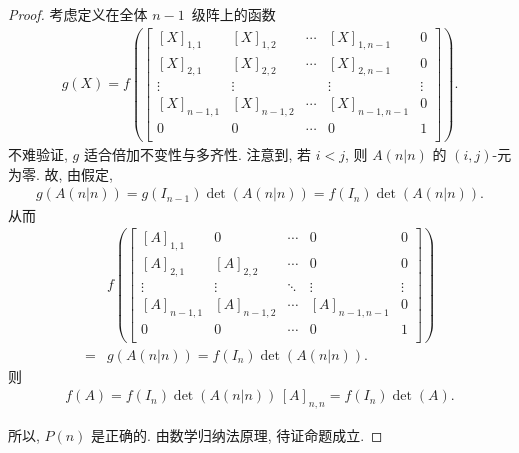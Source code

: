 \begin{proof}
    考虑定义在全体 \(n-1\)~级阵上的函数
    \begin{align*}
        g(X)
        =
        f\left(
        \begin{bmatrix}
            [X]_{1,1}   & [X]_{1,2}   & \cdots & [X]_{1,n-1}   & 0      \\
            [X]_{2,1}   & [X]_{2,2}   & \cdots & [X]_{2,n-1}   & 0      \\
            \vdots      & \vdots      & {}     & \vdots        & \vdots \\
            [X]_{n-1,1} & [X]_{n-1,2} & \cdots & [X]_{n-1,n-1} & 0      \\
            0           & 0           & \cdots & 0             & 1      \\
        \end{bmatrix}
        \right).
    \end{align*}
    不难验证, \(g\) 适合倍加不变性与多齐性.
    注意到, 若 \(i < j\),
    则 \(A(n|n)\) 的 \((i, j)\)-元为零.
    故, 由假定,
    \begin{align*}
        g(A(n|n)) = g(I_{n-1}) \det {(A(n|n))}
        = f(I_n) \det {(A(n|n))}.
    \end{align*}
    从而
    \begin{align*}
             &
        f\left(
        \begin{bmatrix}
                [A]_{1,1}   & 0           & \cdots & 0             & 0      \\
                [A]_{2,1}   & [A]_{2,2}   & \cdots & 0             & 0      \\
                \vdots      & \vdots      & \ddots & \vdots        & \vdots \\
                [A]_{n-1,1} & [A]_{n-1,2} & \cdots & [A]_{n-1,n-1} & 0      \\
                0           & 0           & \cdots & 0             & 1      \\
            \end{bmatrix}
        \right)
        \\
        = {} &
        g(A(n|n)) = f(I_n) \det {(A(n|n))}.
    \end{align*}
    则
    \begin{align*}
        f(A) = f(I_n) \det {(A(n|n))}\,[A]_{n,n}
        = f(I_n) \det {(A)}.
    \end{align*}

    所以, \(P(n)\) 是正确的.
    由数学归纳法原理, 待证命题成立.
\end{proof}


